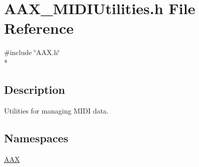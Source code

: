 \hypertarget{a00270}{}\section{A\+A\+X\+\_\+\+M\+I\+D\+I\+Utilities.\+h File Reference}
\label{a00270}
{\ttfamily \#include \char`\"{}A\+A\+X.\+h\char`\"{}}\\*


\subsection{Description}
Utilities for managing M\+I\+D\+I data. 

\subsection*{Namespaces}
\begin{DoxyCompactItemize}
\item 
 \hyperlink{a00288}{A\+A\+X}
\end{DoxyCompactItemize}
